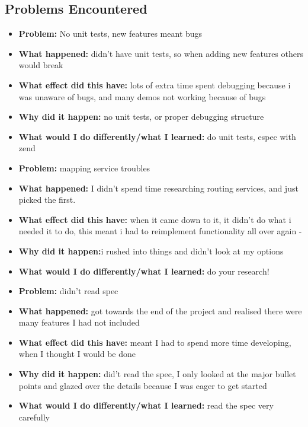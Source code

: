 \subsection{Problems Encountered}
{\color{red}
	\begin{itemize}
		\item \textbf{Problem:} No unit tests, new features meant bugs
		\item \textbf{What happened:} didn't have unit tests, so when adding new features others would break
		\item \textbf{What effect did this have:} lots of extra time spent debugging because i was unaware of bugs, and many demos not working because of bugs 
		\item \textbf{Why did it happen:} no unit tests, or proper debugging structure
		\item \textbf{What would I do differently/what I learned:} do unit tests, espec with zend
	\end{itemize}
		\begin{itemize}
			\item \textbf{Problem:} mapping service troubles
			\item \textbf{What happened:} I didn't spend time researching routing services, and just picked the first. 
			\item \textbf{What effect did this have:} when it came down to it, it didn't do what i needed it to do, this meant i had to reimplement functionality all over again - 
			\item \textbf{Why did it happen:}i rushed into things and didn't look at my options
			\item \textbf{What would I do differently/what I learned:} do your research!
		\end{itemize}
			\begin{itemize}
				\item \textbf{Problem:} didn't read spec
				\item \textbf{What happened:} got towards the end of the project and realised there were many features I had not included
				\item \textbf{What effect did this have:} meant I had to spend more time developing, when I thought I would be done
				\item \textbf{Why did it happen:} did't read the spec, I only looked at the major bullet points and glazed over the details because I was eager to get started
				\item \textbf{What would I do differently/what I learned:} read the spec very carefully
			\end{itemize}
}


